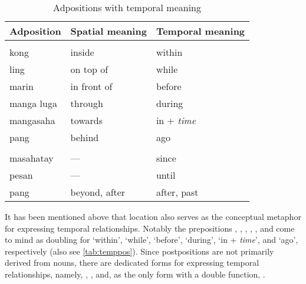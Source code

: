 \begin{table}[p]\centering
\caption{Adpositions with temporal meaning}
\begin{tabu} to \linewidth {I X X}
\tableheaderfont\toprule
Adposition
	& Spatial meaning
	& Temporal meaning
	\\

\toprule

\tablesubheaderfont{} \\

\midrule

kong
	& inside
	& within
	\\

ling
	& on top of
	& while
	\\

marin
	& in front of
	& before
	\\

manga luga
	& through
	& during
	\\

mangasaha
	& towards
	& in + \textit{time}
	\\

pang
	& behind
	& ago
	\\

\midrule

\tablesubheaderfont{} \\

\midrule

masahatay
	& ---
	& since
	\\

pesan
	& ---
	& until
	\\

pang
	& beyond, after
	& after, past
	\\

\bottomrule
\end{tabu}

\label{tab:temppos}
\end{table}

It has been mentioned above that location also serves as the conceptual
metaphor for expressing temporal relationships. Notably the prepositions
, , , , , and
 come to mind as doubling for `within', `while',
`before', `during', `in + \emph{time}', and `ago', respectively (also see
\autoref{tab:temppos}). Since postpositions are not primarily derived from
nouns, there are dedicated forms for expressing temporal relationships, namely,
, , and, as the only
form with a double function, .

